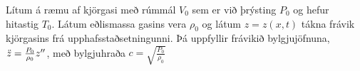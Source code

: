 \ifdefined \wholebook \else\documentclass[oneside]{book}\usepackage{EdlBook}\graphicspath{{figures/}}
\begin{document}
\begin{tcolorbox}
\begin{theorem}
Lítum á ræmu af kjörgasi með rúmmál $V_0$ sem er við þrýsting $P_0$ og hefur hitastig $T_0$. Látum eðlismassa gasins vera $\rho_0$ og látum $z = z(x,t)$ tákna frávik kjörgasins frá upphafsstaðsetningunni. Þá uppfyllir frávikið bylgjujöfnuna, $\Ddot{z} = \frac{P_0}{\rho_0} z''$, með bylgjuhraða $c = \sqrt{\frac{P_0}{\rho_0}}$
\end{theorem}
\end{tcolorbox}

\end{document}
